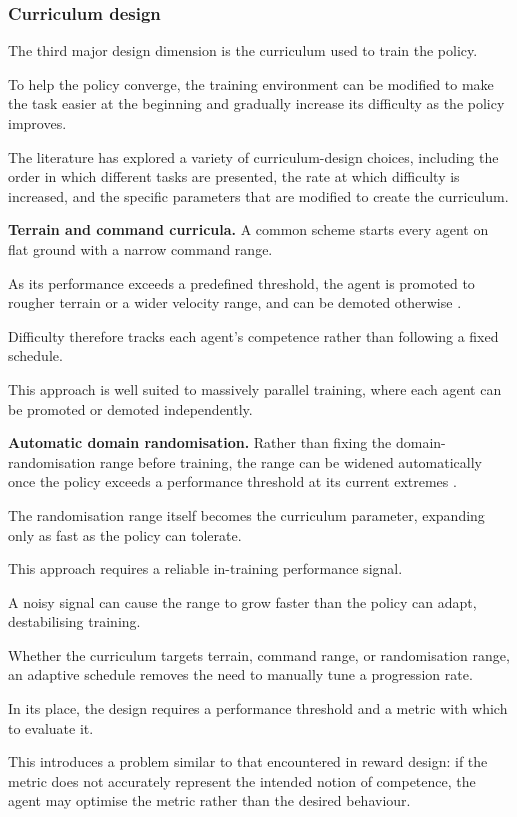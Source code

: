 \subsubsection{Curriculum design}

The third major design dimension is the curriculum used to train the policy.

To help the policy converge, the training environment can be modified to make the task easier at the beginning and gradually increase its difficulty as the policy improves.

The literature has explored a variety of curriculum-design choices, including the order in which different tasks are presented, the rate at which difficulty is increased, and the specific parameters that are modified to create the curriculum.

\textbf{Terrain and command curricula.} A common scheme starts every agent on flat ground with a narrow command range.

As its performance exceeds a predefined threshold, the agent is promoted to rougher terrain or a wider velocity range, and can be demoted otherwise \cite{rudin2021}.

Difficulty therefore tracks each agent's competence rather than following a fixed schedule.

This approach is well suited to massively parallel training, where each agent can be promoted or demoted independently.

\textbf{Automatic domain randomisation.} Rather than fixing the domain-randomisation range before training, the range can be widened automatically once the policy exceeds a performance threshold at its current extremes \cite{akkaya2019rubiks}.

The randomisation range itself becomes the curriculum parameter, expanding only as fast as the policy can tolerate.

This approach requires a reliable in-training performance signal.

A noisy signal can cause the range to grow faster than the policy can adapt, destabilising training.

Whether the curriculum targets terrain, command range, or randomisation range, an adaptive schedule removes the need to manually tune a progression rate.

In its place, the design requires a performance threshold and a metric with which to evaluate it.

This introduces a problem similar to that encountered in reward design: if the metric does not accurately represent the intended notion of competence, the agent may optimise the metric rather than the desired behaviour.

